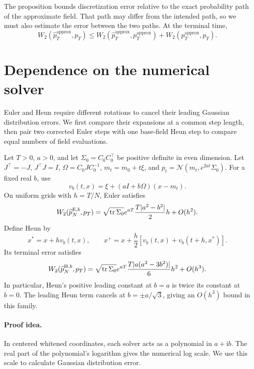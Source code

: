 The proposition bounds discretization error relative to the exact probability path of the approximate field. That path may differ from the intended path, so we must also estimate the error between the two paths. At the terminal time,
\[
 W_2(\widehat p_T^{\mathrm{approx}},p_T)
 \le W_2(\widehat p_T^{\mathrm{approx}},p_T^{\mathrm{approx}})
       +W_2(p_T^{\mathrm{approx}},p_T).
\]

\section{Dependence on the numerical solver}
\label{app:solver}

Euler and Heun require different rotations to cancel their leading Gaussian distribution errors. We first compare their expansions at a common step length, then pair two corrected Euler steps with one base-field Heun step to compare equal numbers of field evaluations.

\begin{proposition}
\label{prop:solver-dependence}
Let $T>0$, $a>0$, and let $\Sigma_0=C_0C_0^\top$ be positive definite in even dimension. Let $J^\top=-J$, $J^\top J=I$, $\Omega=C_0JC_0^{-1}$, $m_t=m_0+t\xi$, and $p_t=\mathcal N(m_t,e^{2at}\Sigma_0)$. For a fixed real $b$, use
\[
 v_b(t,x)=\xi+(aI+b\Omega)(x-m_t).
\]
On uniform grids with $h=T/N$, Euler satisfies
\begin{equation}
 W_2(\widehat p_N^{\mathrm E,b},p_T)
 =\sqrt{\operatorname{tr}\Sigma_0}e^{aT}\frac{T|a^2-b^2|}{2}h+O(h^2).
 \label{eq:gaussian-fixed-sensitivity}
\end{equation}
Define Heun by
\[
 x^*=x+hv_b(t,x),\qquad
 x^+=x+\frac h2[v_b(t,x)+v_b(t+h,x^*)].
\]
Its terminal error satisfies
\begin{equation}
 W_2(\widehat p_N^{\mathrm H,b},p_T)
 =\sqrt{\operatorname{tr}\Sigma_0}e^{aT}
       \frac{T|a(a^2-3b^2)|}{6}h^2+O(h^3).
 \label{eq:heun-leading-error}
\end{equation}
In particular, Heun's positive leading constant at $b=a$ is twice its constant at $b=0$. The leading Heun term cancels at $b=\pm a/\sqrt3$, giving an $O(h^3)$ bound in this family.
\end{proposition}

\paragraph{Proof idea.}
In centered whitened coordinates, each solver acts as a polynomial in $a+\mathrm i b$. The real part of the polynomial's logarithm gives the numerical log scale. We use this scale to calculate Gaussian distribution error.

